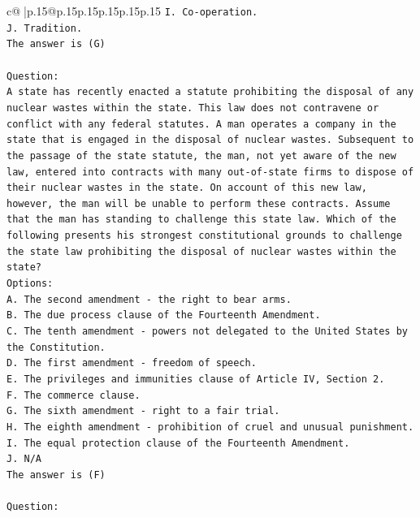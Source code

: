 \documentclass{article}
\begin{document}
{\begin{supertabular}{c@{$\;$}|p{.15\linewidth}@{}p{.15\linewidth}p{.15\linewidth}p{.15\linewidth}p{.15\linewidth}p{.15\linewidth}}
{{{\texttt{I. Co{-}operation.} \\
\texttt{J. Tradition.} \\
\texttt{The answer is (G)} \\
\\ 
\texttt{Question:} \\
\texttt{A state has recently enacted a statute prohibiting the disposal of any nuclear wastes within the state. This law does not contravene or conflict with any federal statutes. A man operates a company in the state that is engaged in the disposal of nuclear wastes. Subsequent to the passage of the state statute, the man, not yet aware of the new law, entered into contracts with many out{-}of{-}state firms to dispose of their nuclear wastes in the state. On account of this new law, however, the man will be unable to perform these contracts. Assume that the man has standing to challenge this state law. Which of the following presents his strongest constitutional grounds to challenge the state law prohibiting the disposal of nuclear wastes within the state?} \\
\texttt{Options:} \\
\texttt{A. The second amendment {-} the right to bear arms.} \\
\texttt{B. The due process clause of the Fourteenth Amendment.} \\
\texttt{C. The tenth amendment {-} powers not delegated to the United States by the Constitution.} \\
\texttt{D. The first amendment {-} freedom of speech.} \\
\texttt{E. The privileges and immunities clause of Article IV, Section 2.} \\
\texttt{F. The commerce clause.} \\
\texttt{G. The sixth amendment {-} right to a fair trial.} \\
\texttt{H. The eighth amendment {-} prohibition of cruel and unusual punishment.} \\
\texttt{I. The equal protection clause of the Fourteenth Amendment.} \\
\texttt{J. N/A} \\
\texttt{The answer is (F)} \\
\\ 
\texttt{Question:} \\
}}}
\end{supertabular}}
\end{document}
